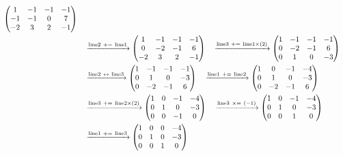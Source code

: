 \documentclass{ltjsarticle}
\begin{document}
\begin{align*}
 \begin{pmatrix}
 1 & -1 & -1 & -1\\
 -1 & -1 & 0 & 7\\
 - 2 & 3 & 2 & -1
\end{pmatrix}\allowdisplaybreaks\\
&\ \ \ \xrightarrow{ \text{line} 2 \ +=\  \text{line} 1 } %
\begin{pmatrix}
 1 & -1 & -1 & -1\\
 0 & - 2 & -1 & 6\\
 - 2 & 3 & 2 & -1
\end{pmatrix}\ \ \ \xrightarrow{ \text{line} 3 \ +=\  \text{line} 1 \times\left( 2 \right)} %
\begin{pmatrix}
 1 & -1 & -1 & -1\\
 0 & - 2 & -1 & 6\\
 0 & 1 & 0 & - 3
\end{pmatrix}\allowdisplaybreaks\\
 &\ \ \ \xrightarrow{ \text{line} 2 \ \leftrightarrow\  \text{line} 3 } %
\begin{pmatrix}
 1 & -1 & -1 & -1\\
 0 & 1 & 0 & - 3\\
 0 & - 2 & -1 & 6
\end{pmatrix}\ \ \ \xrightarrow{ \text{line} 1 \ +=\  \text{line} 2 } %
\begin{pmatrix}
 1 & 0 & -1 & - 4\\
 0 & 1 & 0 & - 3\\
 0 & - 2 & -1 & 6
\end{pmatrix}\allowdisplaybreaks\\
 &\ \ \ \xrightarrow{ \text{line} 3 \ +=\  \text{line} 2 \times\left( 2 \right)} %
\begin{pmatrix}
 1 & 0 & -1 & - 4\\
 0 & 1 & 0 & - 3\\
 0 & 0 & -1 & 0
\end{pmatrix}\ \ \ \xrightarrow{ \text{line} 3 \ \times=\ \left( - 1 \right)} %
\begin{pmatrix}
 1 & 0 & -1 & - 4\\
 0 & 1 & 0 & - 3\\
 0 & 0 & 1 & 0
\end{pmatrix}\allowdisplaybreaks\\
 &\ \ \ \xrightarrow{ \text{line} 1 \ +=\  \text{line} 3 } %
\begin{pmatrix}
 1 & 0 & 0 & - 4\\
 0 & 1 & 0 & - 3\\
 0 & 0 & 1 & 0
\end{pmatrix}
\end{align*}
\end{document}
